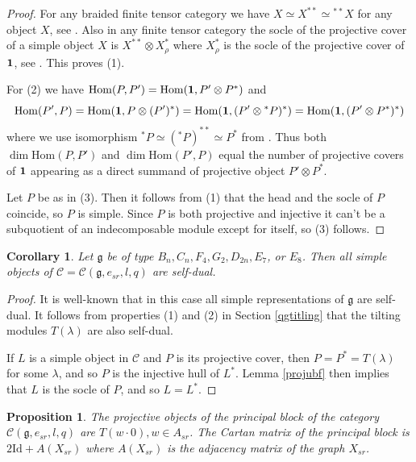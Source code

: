\documentclass{amsart}
\newtheorem{proposition}[theorem]{Proposition}
\newtheorem{corollary}[theorem]{Corollary}
\theoremstyle{definition}
\newcommand{\C}{\mathcal{C}}
\newcommand{\g}{\mathfrak{g}}
\newcommand{\Id}{\text{Id}}
\newcommand{\Hom}{\mathrm{Hom}}
\newcommand{\be}{{\bf 1}}
\numberwithin{equation}{section}
\begin{document}
\begin{proof}
    For any braided finite tensor category we have $X\simeq X^{**}\simeq \phantom{}^{**}X$ 
    for any object $X$, see \cite[Proposition 8.10.6]{EGNO}. Also in any finite tensor category
    the socle of the projective cover of a simple object $X$ is $X^{**}\otimes X_\rho^*$
    where $X_\rho^*$ is the socle of the projective cover of $\be$, see 
\cite[6.4]{EGNO}. This proves (1).

For (2) we have $\Hom(P,P')=\Hom(\be, P'\otimes P^*)$ and $$\Hom(P',P)=\Hom(\be, P\otimes (P')^*)=
\Hom(\be, (P'\otimes \phantom{}^*P)^*)=\Hom(\be, (P'\otimes P^*)^*)$$ where we use isomorphism $\phantom{}^*P\simeq (\phantom{}^*P)^{**}\simeq P^*$ from \cite[Proposition 8.10.6]{EGNO}.
Thus both $\dim \Hom(P,P')$ and $\dim \Hom(P',P)$ equal the number of projective covers of $\be$
appearing as a direct summand of projective object $P'\otimes P^*$.

Let $P$ be as in (3). Then it follows from (1) that the head and the socle of $P$ coincide,
so $P$ is simple. Since $P$ is both projective and injective it can't be a subquotient
of an indecomposable module except for itself, so (3) follows.
\end{proof}

\begin{corollary} \label{cor:self-dual}
    Let $\mathfrak g$ be of type $B_n, C_n, F_4, G_2, D_{2n}, E_7$, or $E_8$.
    Then all simple objects of $\C=\C(\mathfrak g, e_{sr}, l, q)$ are self-dual. 
\end{corollary}
\begin{proof}
    It is well-known that in this case all simple representations of $\mathfrak g$ are self-dual. It follows from properties (1) and (2) in Section \ref{qgtitling} that the tilting modules $T(\lambda)$ are also self-dual. 

    If $L$ is a simple object in $\C$ and $P$ is its projective cover, then $P=P^*=T(\lambda)$ for some $\lambda$, and so $P$ is the injective hull of $L^*$. Lemma \ref{projubf} then implies that $L$ is the socle of $P$, and so $L= L^*$. 
\end{proof}

\begin{proposition}\label{Cartansr}
   The projective objects of the principal block of the category $\C(\g,e_{sr},l,q)$ are 
   $T(w\cdot 0), w\in A_{sr}$. The Cartan matrix of the principal block is
   $2\Id+A(X_{sr})$ where $A(X_{sr})$ is the adjacency matrix of the graph $X_{sr}$.
\end{proposition}
\end{document}
